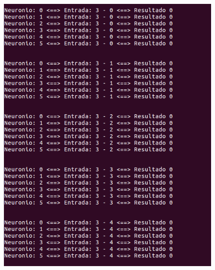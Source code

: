 \documentclass[hidelinks,12pt]{article}
\begin{document}
		\begin{figure}[!h]
			\centering
			\includegraphics[scale=0.5]{Figures/E3S3P1.png}
		\end{figure}
		
\end{document}
